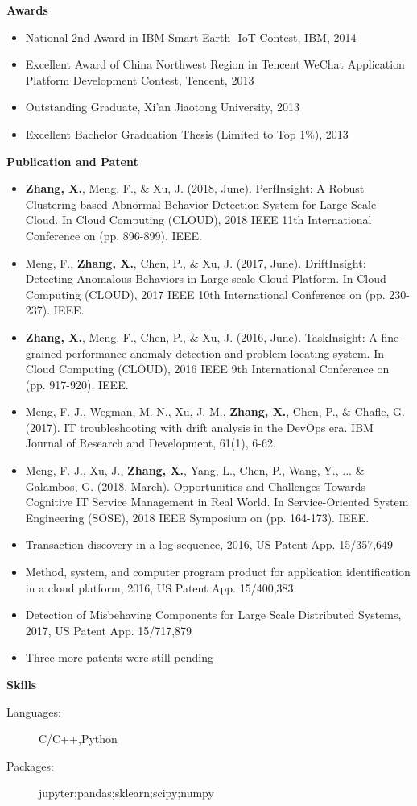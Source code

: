 \documentclass[letterpaper,11pt]{article}
\newcommand{\resheading}[1]{{\large \colorbox{mygrey}{\begin{minipage}{\textwidth}{\textbf{#1 \vphantom{p\^{E}}}}\end{minipage}}}}
\begin{document}
\resheading{Awards}
	\begin{itemize}
		\item
			National 2nd Award in IBM Smart Earth- IoT Contest, IBM, 2014
		\item
			Excellent Award of China Northwest Region in Tencent WeChat Application Platform Development Contest, Tencent, 2013
		\item
			Outstanding Graduate, Xi'an Jiaotong University, 2013
		\item
			Excellent Bachelor Graduation Thesis (Limited to Top 1\%), 2013
	\end{itemize}
	

	



\resheading{Publication and Patent}
	\begin{itemize}
		\item
			\textbf{Zhang, X.}, Meng, F., \& Xu, J. (2018, June).  PerfInsight: A Robust Clustering-based Abnormal Behavior Detection System for Large-Scale Cloud. In Cloud Computing (CLOUD), 2018 IEEE 11th International Conference on (pp. 896-899). IEEE.
		\item
			Meng, F., \textbf{Zhang, X.}, Chen, P., \& Xu, J. (2017, June). DriftInsight: Detecting Anomalous Behaviors in Large-scale Cloud Platform. In Cloud Computing (CLOUD), 2017 IEEE 10th International Conference on (pp. 230-237). IEEE.
		\item
			\textbf{Zhang, X.}, Meng, F., Chen, P., \& Xu, J. (2016, June). TaskInsight: A fine-grained performance anomaly detection and problem locating system. In Cloud Computing (CLOUD), 2016 IEEE 9th International Conference on (pp. 917-920). IEEE.
		\item
			Meng, F. J., Wegman, M. N., Xu, J. M., \textbf{Zhang, X.}, Chen, P., \& Chafle, G. (2017). IT troubleshooting with drift analysis in the DevOps era. IBM Journal of Research and Development, 61(1), 6-62.
		\item
			Meng, F. J., Xu, J., \textbf{Zhang, X.}, Yang, L., Chen, P., Wang, Y., ... \& Galambos, G. (2018, March). Opportunities and Challenges Towards Cognitive IT Service Management in Real World. In Service-Oriented System Engineering (SOSE), 2018 IEEE Symposium on (pp. 164-173). IEEE.
		\item
			Transaction discovery in a log sequence, 2016, US Patent App. 15/357,649
		\item
			Method, system, and computer program product for application identification in a cloud platform, 2016, US Patent App. 15/400,383
		\item
		    Detection of Misbehaving Components for Large Scale Distributed Systems, 2017, US Patent App. 15/717,879
		\item
		    Three more patents were still pending
		\end{itemize}

\resheading{Skills}
	\begin{description}
		\item[Languages:] { \footnotesize C/C++,Python}
		\item[Packages:]{\footnotesize {jupyter};{pandas};{sklearn};{scipy};{numpy}}  
	\end{description} %
\end{document}
